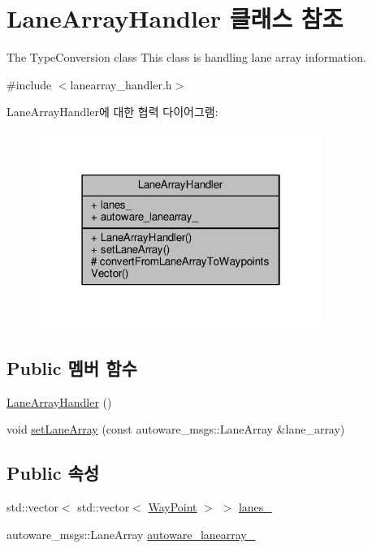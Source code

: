 \hypertarget{class_lane_array_handler}{}\section{Lane\+Array\+Handler 클래스 참조}
\label{class_lane_array_handler}


The Type\+Conversion class This class is handling lane array information.  




{\ttfamily \#include $<$lanearray\+\_\+handler.\+h$>$}



Lane\+Array\+Handler에 대한 협력 다이어그램\+:\nopagebreak
\begin{figure}[H]
\begin{center}
\leavevmode
\includegraphics[width=262pt]{class_lane_array_handler__coll__graph}
\end{center}
\end{figure}
\subsection*{Public 멤버 함수}
\begin{DoxyCompactItemize}
\item 
\hyperlink{class_lane_array_handler_a5ffda8b0667a0b1060b4efe8d07789e1}{Lane\+Array\+Handler} ()
\item 
void \hyperlink{class_lane_array_handler_a345c18674ccfcbf1104bd5b030e04c0b}{set\+Lane\+Array} (const autoware\+\_\+msgs\+::\+Lane\+Array \&lane\+\_\+array)
\end{DoxyCompactItemize}
\subsection*{Public 속성}
\begin{DoxyCompactItemize}
\item 
std\+::vector$<$ std\+::vector$<$ \hyperlink{class_way_point}{Way\+Point} $>$ $>$ \hyperlink{class_lane_array_handler_a5f6a1e79b64a9092bfad57fd6676432b}{lanes\+\_\+}
\item 
autoware\+\_\+msgs\+::\+Lane\+Array \hyperlink{class_lane_array_handler_ab6fec5fc6f51e9b00949766093608b6f}{autoware\+\_\+lanearray\+\_\+}
\end{DoxyCompactItemize}
